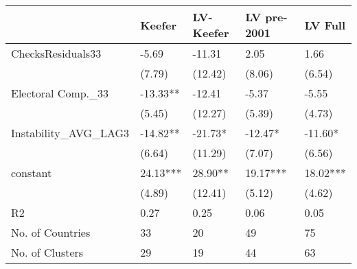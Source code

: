\begin{tabular}{lllll}
  \hline
 & Keefer & LV-Keefer & LV pre-2001 & LV Full \\ 
  \hline
ChecksResiduals33 & -5.69 & -11.31 & 2.05 & 1.66 \\ 
   & (7.79) & (12.42) & (8.06) & (6.54) \\ 
  Electoral Comp.\_33 & -13.33** & -12.41 & -5.37 & -5.55 \\ 
   & (5.45) & (12.27) & (5.39) & (4.73) \\ 
  Instability\_AVG\_LAG3 & -14.82** & -21.73* & -12.47* & -11.60* \\ 
   & (6.64) & (11.29) & (7.07) & (6.56) \\ 
  constant & 24.13*** & 28.90** & 19.17*** & 18.02*** \\ 
   & (4.89) & (12.41) & (5.12) & (4.62) \\ 
  R2 & 0.27 & 0.25 & 0.06 & 0.05 \\ 
  No. of Countries & 33 & 20 & 49 & 75 \\ 
  No. of Clusters & 29 & 19 & 44 & 63 \\ 
   \hline
\end{tabular}
